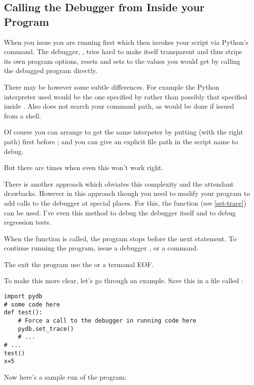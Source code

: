 \subsection{Calling the Debugger from Inside your Program}\label{subsection-calling-pydb-inside-program}

When you issue  you are running 
first which then invokes your script  via Python's
 command. The debugger, , tries hard to make
itself transparent and thus strips its own program options, resets
 and sets  to the values you would get
by calling the debugged program directly.

There may be however some subtle differences. For example the Python
interpreter used would be the one specified by  rather than
possibly that specified inside . Also 
does not search your command path, as would be done if issued from a
shell.

Of course you can arrange to get the same interpeter by putting
 (with the right path) first before ; and you
can give an explicit file path in the script name to debug.

But there are times when even this won't work right.

There is another approach which obviates this complexity and the
attendant drawbacks. However in this approach though you need to
modify your program to add calls to the debugger at special
places. For this, the  function  (see
\ref{set-trace}) can be used. I've even this method to debug the
debugger itself and to debug regression tests.

When the  function is called, the program stops
before the next statement. To continue running the program, issue a
debugger ,  or a  command.

The exit the program use the  or a termanal EOF.

To make this more clear, let's go through an example. Save this in a
file called :

\begin{verbatim}
import pydb
# some code here
def test():
    # Force a call to the debugger in running code here
    pydb.set_trace()
    # ...
# ...
test()
x=5
\end{verbatim}

Now here's a sample run of the program:

